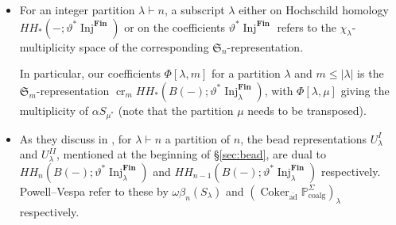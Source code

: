 \documentclass[12pt]{article}
\newcommand{\SymGroup}[1][n]{\mathfrak{S}_{#1}}
\newcommand{\Specht}[1]{\chi_{#1}}
\newcommand{\TransposePartition}[1]{{#1}^{\ast}}
\DeclareMathOperator{\gr}{gr}
\DeclareMathOperator{\Out}{Out}
\theoremstyle{plain}
\theoremstyle{definition}
\theoremstyle{remark}
\begin{document}
\begin{itemize}
    The associated graded representation we call $\gr H_c^*(F(\vee_{i=1}^g S^1, n))$ corresponds in their formalism to $\alpha_n \operatorname{cr}_n HH_*(B(-); \vartheta^*\operatorname{Inj}^{\textbf{Fin}})$, evaluated at $F_g$. Here $\operatorname{cr}_n$ is the functor that extracts the $n$-th coefficient of a polynomial functor, returning an $\SymGroup$-representation, and $\alpha_n$ converts this representation into a sum of Schur functors.
    
    \item For an integer partition $\lambda\vdash n$, a subscript $\lambda$ either on Hochschild homology $HH_*(-;\vartheta^*\operatorname{Inj}^{\textbf{Fin}})$ or on the coefficients $\vartheta^*\operatorname{Inj}^{\textbf{Fin}}$ refers to the $\Specht{\lambda}$-multiplicity space of the corresponding $\SymGroup$-representation.
    
    In particular, our coefficients $\Phi[\lambda, m]$ for a partition $\lambda$ and $m\leq |\lambda|$ is the $\SymGroup[m]$-representation $ \operatorname{cr}_m HH_*(B(-); \vartheta^*\operatorname{Inj}^{\textbf{Fin}}_{\lambda})$, with $\Phi[\lambda, \mu]$ giving the multiplicity of $\alpha S_{\TransposePartition{\mu}}$ (note that the partition $\mu$ needs to be transposed).
    
    \item As they discuss in \cite[\S 16.3]{PV18}, for $\lambda\vdash n$ a partition of $n$, the bead representations $U_{\lambda}^{I}$ and $U_{\lambda}^{II}$, mentioned at the beginning of \S\ref{sec:bead}, are dual to $HH_n(B(-); \vartheta^*\operatorname{Inj}^{\textbf{Fin}}_{\lambda})$ and $HH_{n-1}(B(-); \vartheta^*\operatorname{Inj}^{\textbf{Fin}}_{\lambda})$ respectively. Powell--Vespa refer to these by $\omega\beta_n(S_{\lambda})$ and $(\operatorname{Coker}_{\overline{\operatorname{ad}}}\mathbb{P}^{\Sigma}_{\operatorname{coalg}})_{\lambda}$ respectively.

    

\end{itemize}
\end{document}
